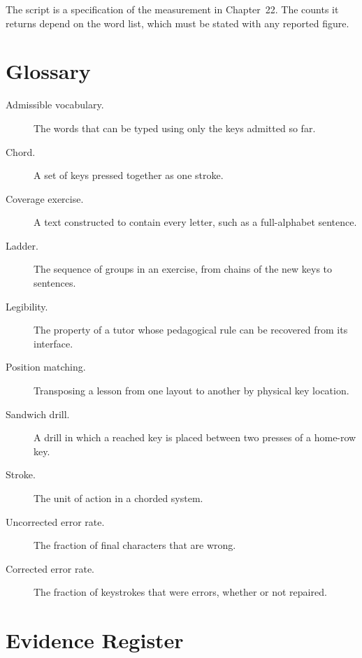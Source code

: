 The script is a specification of the measurement in Chapter~22. The counts it returns depend on the word list, which must be stated with any reported figure.

\chapter{Glossary}

\begin{description}
\item[Admissible vocabulary.] The words that can be typed using only the keys admitted so far.
\item[Chord.] A set of keys pressed together as one stroke.
\item[Coverage exercise.] A text constructed to contain every letter, such as a full-alphabet sentence.
\item[Ladder.] The sequence of groups in an exercise, from chains of the new keys to sentences.
\item[Legibility.] The property of a tutor whose pedagogical rule can be recovered from its interface.
\item[Position matching.] Transposing a lesson from one layout to another by physical key location.
\item[Sandwich drill.] A drill in which a reached key is placed between two presses of a home-row key.
\item[Stroke.] The unit of action in a chorded system.
\item[Uncorrected error rate.] The fraction of final characters that are wrong.
\item[Corrected error rate.] The fraction of keystrokes that were errors, whether or not repaired.
\end{description}

\chapter{Evidence Register}

